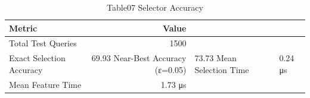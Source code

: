 \begin{table}[htbp]
\centering
\caption{Table07 Selector Accuracy}
\begin{tabular}{lr}
\hline
Metric & Value \\
\hline
Total Test Queries & 1500 \\
Exact Selection Accuracy & 69.93%
Near-Best Accuracy (ε=0.05) & 73.73%
Mean Selection Time & 0.24 μs \\
Mean Feature Time & 1.73 μs \\
\hline
\end{tabular}
\end{table}
